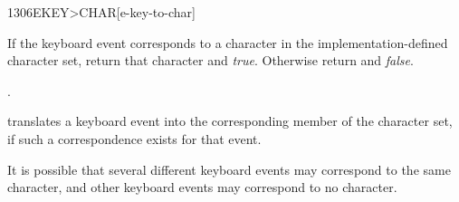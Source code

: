 \begin{worddef}[EKEYtoCHAR]{1306}{EKEY>CHAR}[e-key-to-char]
\item {}

	If the keyboard event  corresponds to a character in the
	implementation-defined character set, return that character and
	\emph{true}. Otherwise return  and \emph{false}.

\see {}.

	\begin{rationale} %
		 translates a keyboard event into the
		corresponding member of the character set, if such a
		correspondence exists for that event.

		It is possible that several different keyboard events may
		correspond to the same character, and other keyboard events
		may correspond to no character.
	\end{rationale}
\end{worddef}





